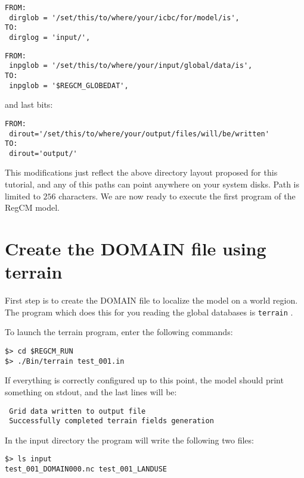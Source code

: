\begin{Verbatim}
FROM:
 dirglob = '/set/this/to/where/your/icbc/for/model/is',
TO:
 dirglog = 'input/',
\end{Verbatim}

\begin{Verbatim}
FROM:
 inpglob = '/set/this/to/where/your/input/global/data/is',
TO:
 inpglob = '$REGCM_GLOBEDAT',
\end{Verbatim}

and last bits:

\begin{Verbatim}
FROM:
 dirout='/set/this/to/where/your/output/files/will/be/written'
TO:
 dirout='output/'
\end{Verbatim}

This modifications just reflect the above directory layout proposed for this
tutorial, and any of this paths can point anywhere on your system disks. Path
is limited to $256$ characters.
We are now ready to execute the first program of the RegCM model.

\section{Create the DOMAIN file using terrain}

First step is to create the DOMAIN file to localize the model on a world region.
The program which does this for you reading the global databases is
\verb=terrain= .

To launch the terrain program, enter the following commands:

\begin{Verbatim}
$> cd $REGCM_RUN
$> ./Bin/terrain test_001.in
\end{Verbatim}

If everything is correctly configured up to this point, the model should print
something on stdout, and the last lines will be:

\begin{Verbatim}
 Grid data written to output file                                               
 Successfully completed terrain fields generation
\end{Verbatim}

In the input directory the program will write the following two files:

\begin{Verbatim}
$> ls input
test_001_DOMAIN000.nc test_001_LANDUSE
\end{Verbatim}

